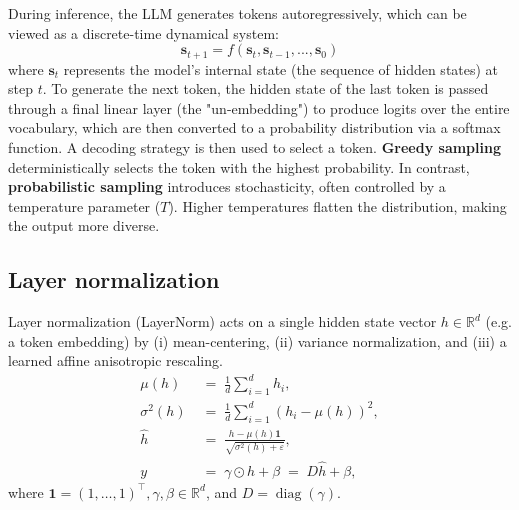\documentclass[a4paper,12pt]{article}
\begin{document}
During inference, the LLM generates tokens autoregressively, which can be viewed as a discrete-time dynamical system:
\begin{equation}
    \mathbf{s}_{t+1} = f(\mathbf{s}_t, \mathbf{s}_{t-1}, ..., \mathbf{s}_0) %
\end{equation}
where $\mathbf{s}_t$ represents the model's internal state (the sequence of hidden states) at step $t$. To generate the next token, the hidden state of the last token is passed through a final linear layer (the "un-embedding") to produce logits over the entire vocabulary, which are then converted to a probability distribution via a softmax function. A decoding strategy is then used to select a token. \textbf{Greedy sampling} deterministically selects the token with the highest probability. In contrast, \textbf{probabilistic sampling} introduces stochasticity, often controlled by a temperature parameter ($T$). Higher temperatures flatten the distribution, making the output more diverse.

\subsection{Layer normalization}
Layer normalization (LayerNorm) acts on a single hidden state vector \(h\in\mathbb{R}^d\) (e.g. a token embedding) by (i) mean-centering, (ii) variance normalization, and (iii) a learned affine anisotropic rescaling.
\begin{align}
\mu(h) &\;=\; \frac{1}{d}\sum_{i=1}^d h_i, \\
\sigma^2(h) &\;=\; \frac{1}{d}\sum_{i=1}^d (h_i-\mu(h))^2, \\
\widehat{h} &\;=\; \frac{h - \mu(h)\mathbf{1}}{\sqrt{\sigma^2(h)+\varepsilon}}, \label{eq:ln_norm}\\
y &\;=\; \gamma \odot \widehat{h} + \beta \;=\; D\widehat{h} + \beta, \label{eq:ln_affine}
\end{align}
where \(\mathbf{1}=(1,\dots,1)^\top , \gamma, \beta \in\mathbb{R}^d\), and \(D=\operatorname{diag}(\gamma)\).
\end{document}
